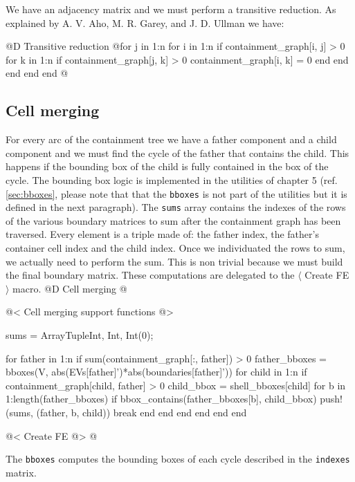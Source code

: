 \documentclass[10pt]{book}
\begin{document}
We have an adjacency matrix and we must perform a transitive reduction.
As explained by A. V. Aho, M. R. Garey, and J. D. Ullman \cite{parallel_transitive_reduction}
we have:

@D Transitive reduction
@{for j in 1:n
    for i in 1:n
        if containment_graph[i, j] > 0
            for k in 1:n
                if containment_graph[j, k] > 0
                    containment_graph[i, k] = 0
                end
            end
        end
    end
end
@}

\subsection{Cell merging}

For every arc of the containment tree we have a father component 
and a child component and we must find the cycle of the father that
contains the child. This happens if the bounding box of the child is fully
contained in the box of the cycle. The bounding box logic is implemented
in the utilities of chapter 5 (ref. \ref{sec:bboxes}, please note that
that the \texttt{bboxes} is not part of the utilities but it is defined 
in the next paragraph). The \texttt{sums} array contains the indexes of 
the rows of the various boundary matrices to sum after the containment 
graph has been traversed. Every element is a triple made of: the father 
index, the father's container cell index and the child index.
Once we individuated the rows to sum, we actually need to perform the sum.
This is non trivial because we must build the final boundary matrix.
These computations are delegated to the $\langle$ Create FE $\rangle$ macro.
@D Cell merging
@{@< Cell merging support functions @>

sums = Array{Tuple{Int, Int, Int}}(0);

for father in 1:n
    if sum(containment_graph[:, father]) > 0
        father_bboxes = bboxes(V, abs(EVs[father]')*abs(boundaries[father]'))
        for child in 1:n
            if containment_graph[child, father] > 0
                child_bbox = shell_bboxes[child]
                for b in 1:length(father_bboxes)
                    if bbox_contains(father_bboxes[b], child_bbox)
                        push!(sums, (father, b, child))
                        break
                    end
                end
            end            
        end
    end
end

@< Create FE @>
@}

The \texttt{bboxes} computes the bounding boxes of each cycle
described in the \texttt{indexes} matrix.
\end{document}
